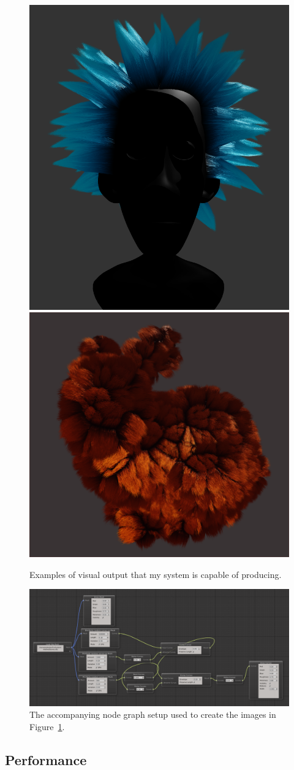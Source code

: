 \documentclass[]{acmsiggraph}
\begin{document}
\begin{figure}[htbp]
\centering
\includegraphics[width=0.45\linewidth]{images/rick}
\hfill
\includegraphics[width=0.45\linewidth]{images/bunny}
\caption{\label{figure:screenshots} Examples of visual output that my system is capable of producing.}
\end{figure}

\begin{figure}[htbp]\centering
\includegraphics[width=1.0\linewidth]{images/nodes}
\caption{\label{figure:screenshot_gui} The accompanying node graph setup used to create the images in Figure~\ref{figure:screenshots}.}
\end{figure}

\subsection{Performance} \label{sec:performance}
\end{document}
